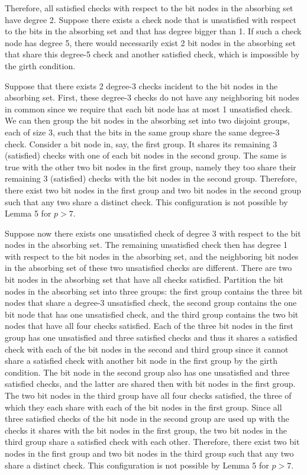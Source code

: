 Therefore, all satisfied checks with respect to the bit nodes in
the absorbing set have degree 2. Suppose there exists a check node
that is unsatisfied with respect to the bits in the absorbing set
and that has degree bigger than 1. If such a check node has degree
5, there would necessarily exist 2 bit nodes in the absorbing set
that share this degree-5 check and another satisfied check, which
is impossible by the girth condition.

Suppose that there exists 2 degree-3 checks incident to the bit
nodes in the absorbing set. First, these degree-3 checks do not
have any neighboring bit nodes in common since we require that
each bit node has at most 1 unsatisfied check. We can then group
the bit nodes in the absorbing set into two disjoint groups, each
of size 3, such that the bits in the same group share the same
degree-3 check. Consider a bit node in, say, the first group. It
shares its remaining 3 (satisfied) checks with one of each bit
nodes in the second group. The same is true with the other two bit
nodes in the first group, namely they too share their remaining 3
(satisfied) checks with the bit nodes in the second group.
Therefore, there exist two bit nodes in the first group and two
bit nodes in the second group such that any two share a distinct
check. This configuration is not possible by Lemma 5 for $p>7$.

Suppose now there exists one unsatisfied check of degree 3 with
respect to the bit nodes in the absorbing set. The remaining
unsatisfied check then has degree 1 with respect to the bit nodes
in the absorbing set, and the neighboring bit nodes in the
absorbing set of these two unsatisfied checks are different. There
are two bit nodes in the absorbing set that have all checks
satisfied. Partition the bit nodes in the absorbing set into three
groups: the first group contains the three  bit nodes that share a
degree-3 unsatisfied check, the second group contains the one bit
node that has one unsatisfied check, and the third group contains
the two bit nodes that have all four checks satisfied. Each of the
three bit nodes in the first group has one unsatisfied and three
satisfied checks and thus it shares a satisfied check with each of
the bit nodes in the second and third group since it cannot share
a satisfied check with another bit node in the first group by the
girth condition. The bit node in the second group also has one
unsatisfied and three satisfied checks, and the latter are shared
then with bit nodes in the first group. The two bit nodes in the
third group have all four checks satisfied, the three of which
they each share with each of the bit nodes in the first group.
Since all three satisfied checks of the bit node in the second
group are used up with the checks it shares with the bit nodes in
the first group, the two bit nodes in the third group share a
satisfied check with each other. Therefore, there exist two bit
nodes in the first group and two bit nodes in the third group such
that any two share a distinct check. This configuration is not
possible by Lemma 5 for $p>7$.

